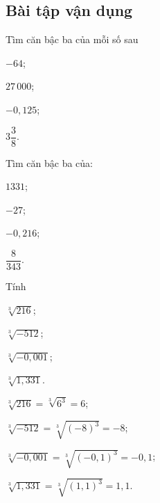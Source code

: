 \subsection{Bài tập vận dụng}
\begin{bt}
	Tìm căn bậc ba của mỗi số sau
	\begin{enumEX}{4}
	\item $-64$;
	\item $27\,000$;
	\item $-0{,}125$;
	\item $3\dfrac{3}{8}$.
	\end{enumEX}
\end{bt}
\begin{bt}
	Tìm căn bậc ba của:
	\begin{listEX}[4]
	\item $1331$;
	\item $-27$;
	\item $-0{,}216$;
	\item $\dfrac{8}{343}$.
	\end{listEX}
\end{bt}
\begin{bt}
	Tính
	\begin{listEX}[4]
	\item $\sqrt[3]{216}$;
	\item $\sqrt[3]{-512}$;
	\item $\sqrt[3]{-0{,}001}$;
	\item $\sqrt[3]{1{,}331}$.
	\end{listEX}
	\loigiai
	{
	\begin{listEX}[2]
	\item $\sqrt[3]{216}=\sqrt[3]{6^3}=6$;
	\item $\sqrt[3]{-512}=\sqrt[3]{(-8)^3}=-8$;
	\item $\sqrt[3]{-0{,}001}=\sqrt[3]{(-0{,}1)^3}=-0{,}1$;
	\item $\sqrt[3]{1{,}331}=\sqrt[3]{(1{,}1)^3}=1{,}1$.
	\end{listEX}
	}
\end{bt}
